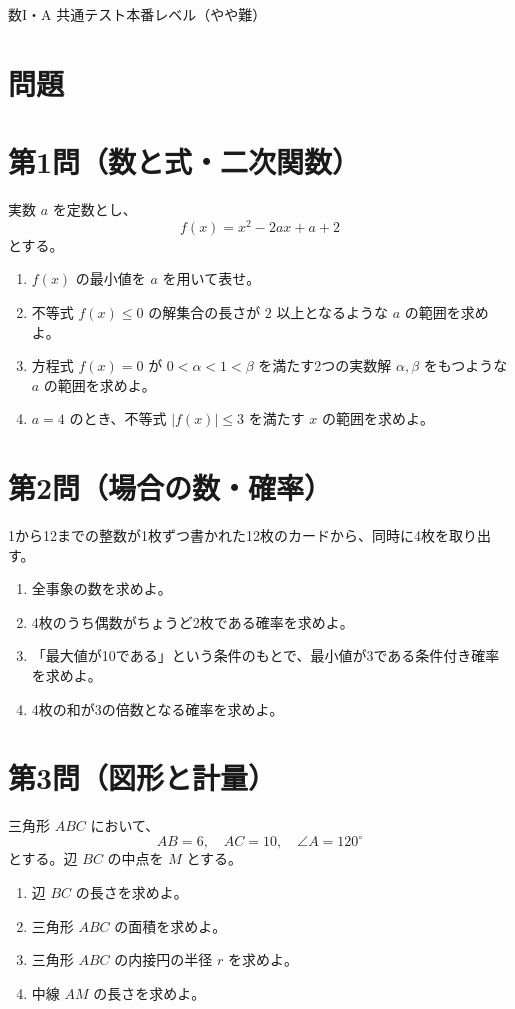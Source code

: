 \documentclass[a4paper,12pt]{jsarticle}
\begin{document}
\begin{center}
{\LARGE 数I・A 共通テスト本番レベル（やや難）}
\end{center}

\vspace{1em}

\section*{問題}

\section*{第1問（数と式・二次関数）}
実数 $a$ を定数とし、
\[
f(x)=x^2-2ax+a+2
\]
とする。
\begin{enumerate}[label=\arabic*.]
  \item $f(x)$ の最小値を $a$ を用いて表せ。
  \item 不等式 $f(x)\le 0$ の解集合の長さが $2$ 以上となるような $a$ の範囲を求めよ。
  \item 方程式 $f(x)=0$ が $0<\alpha<1<\beta$ を満たす2つの実数解 $\alpha,\beta$ をもつような $a$ の範囲を求めよ。
  \item $a=4$ のとき、不等式 $|f(x)|\le 3$ を満たす $x$ の範囲を求めよ。
\end{enumerate}

\section*{第2問（場合の数・確率）}
1から12までの整数が1枚ずつ書かれた12枚のカードから、同時に4枚を取り出す。
\begin{enumerate}[label=\arabic*.]
  \item 全事象の数を求めよ。
  \item 4枚のうち偶数がちょうど2枚である確率を求めよ。
  \item 「最大値が10である」という条件のもとで、最小値が3である条件付き確率を求めよ。
  \item 4枚の和が3の倍数となる確率を求めよ。
\end{enumerate}

\section*{第3問（図形と計量）}
三角形 $ABC$ において、
\[
AB=6,\quad AC=10,\quad \angle A=120^\circ
\]
とする。辺 $BC$ の中点を $M$ とする。
\begin{enumerate}[label=\arabic*.]
  \item 辺 $BC$ の長さを求めよ。
  \item 三角形 $ABC$ の面積を求めよ。
  \item 三角形 $ABC$ の内接円の半径 $r$ を求めよ。
  \item 中線 $AM$ の長さを求めよ。
\end{enumerate}
\end{document}
